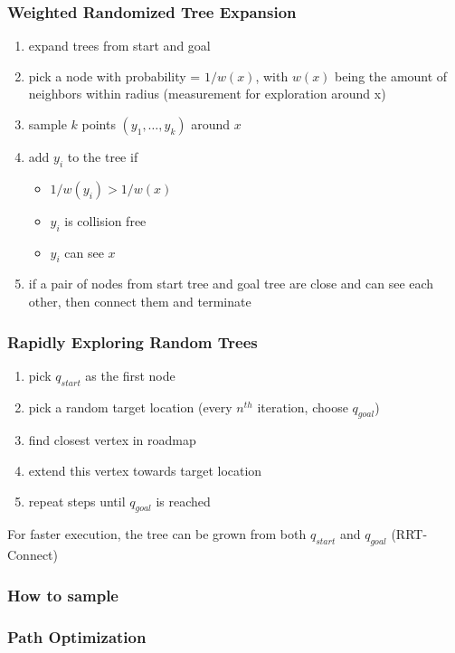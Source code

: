 \documentclass{beamer}
\begin{document}
  \begin{frame}
    \frametitle{Weighted Randomized Tree Expansion}
    \begin{enumerate}
      \item expand trees from start and goal
      \item pick a node with probability = $1/w(x)$, with $w(x)$ being the amount of neighbors within radius (measurement for exploration around x)
      \item sample $k$ points $(y_{1}, \dots, y_{k})$ around $x$
      \item add $y_{i}$ to the tree if
        \begin{itemize}
        \item $1/w(y_{i}) > 1/w(x)$
        \item $y_{i}$ is collision free
        \item $y_{i}$ can see $x$
        \end{itemize}
      \item if a pair of nodes from start tree and goal tree are close and can see each other, then connect them and terminate
    \end{enumerate}  
  
  \end{frame}

  \begin{frame}
    \frametitle{Rapidly Exploring Random Trees}
    \begin{enumerate}
      \item pick $q_{start}$ as the first node
      \item pick a random target location (every $n^{th}$ iteration, choose $q_{goal}$)
      \item find closest vertex in roadmap
      \item extend this vertex towards target location
      \item repeat steps until $q_{goal}$ is reached
    \end{enumerate}

    For faster execution, the tree can be grown from both $q_{start}$ and $q_{goal}$ (RRT-Connect)
  
  \end{frame}

  \begin{frame}
    \frametitle{How to sample}
  
  \end{frame}

  \begin{frame}
    \frametitle{Path Optimization}
  \end{frame}
\end{document}
